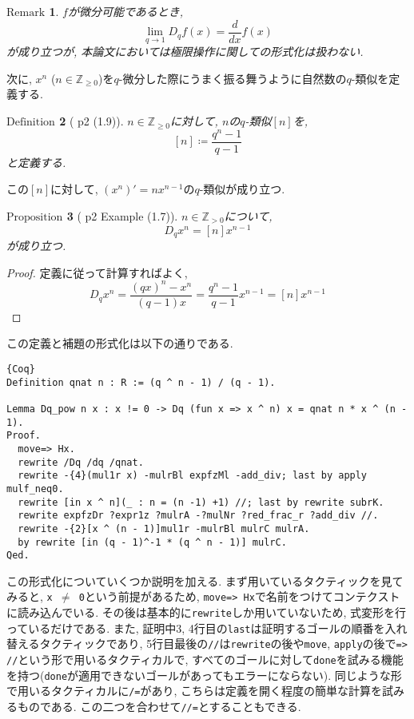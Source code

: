 \documentclass[11pt]{jsreport}
\theoremstyle{mystyle}
\newtheorem{df}{$\textrm{Definition}$}[subsection]
\newtheorem{prop}[df]{$\textrm{Proposition}$}
\newtheorem{rmk}[df]{$\textrm{Remark}$}
\newcommand{\bdf}{\begin{shadebox} \begin{df}}
\newcommand{\edf}{\end{df} \end{shadebox}}
\newcommand{\bprop}{\begin{shadebox} \begin{prop}}
\newcommand{\eprop}{\end{prop} \end{shadebox}}
\newcommand{\brmk}{\begin{rmk}}
\newcommand{\ermk}{\end{rmk}}
\newcommand{\bpf}{\begin{proof}}
\newcommand{\epf}{\end{proof}}
\newcommand{\ra}{\rightarrow}
\newcommand{\Z}{\mathbb{Z}}
\newcommand{\0}{\textbf{0}}
\newcommand{\1}{\textbf{1}}
\newcommand{\2}{\textbf{2}}
\begin{document}
\brmk
  $f$が微分可能であるとき, 
  \[
    \lim_{q\ra1} D_qf(x) = \frac{d}{dx}f(x)
  \] 
  が成り立つが, 本論文においては極限操作に関しての形式化は扱わない. 
\ermk
次に, $x ^ n$ ($n \in \Z_{\ge 0}$)を$q$-微分した際にうまく振る舞うように自然数の$q$-類似を定義する. 
\bdf[\cite{Kac} p2 (1.9)]
  $n \in \Z_{\ge 0}$に対して, $n$の$q$-類似$[n]$を, 
  \[
    [n] \coloneqq \frac{q^n - 1}{q - 1}
  \]
  と定義する. 
\edf
この$[n]$に対して, $(x^n)' = n x^{n-1}$の$q$-類似が成り立つ.
\bprop[\cite{Kac} p2 Example (1.7)]
  $n \in \Z_{>0}$について, 
  \[
    D_q x^n = [n] x ^{n - 1}
  \]
  が成り立つ. 
\eprop
\bpf
  定義に従って計算すればよく, 
  \[
    D_q x ^ n = \frac{(qx) ^ n - x ^ n}{(q - 1) x}
                 = \frac{q^n - 1}{q - 1} x ^ {n - 1}
                 = [n] x ^ {n - 1}
  \] 
\epf
この定義と補題の形式化は以下の通りである. 
\begin{lstlisting}{Coq}
Definition qnat n : R := (q ^ n - 1) / (q - 1).

Lemma Dq_pow n x : x != 0 -> Dq (fun x => x ^ n) x = qnat n * x ^ (n - 1).
Proof.
  move=> Hx.
  rewrite /Dq /dq /qnat.
  rewrite -{4}(mul1r x) -mulrBl expfzMl -add_div; last by apply mulf_neq0.
  rewrite [in x ^ n](_ : n = (n -1) +1) //; last by rewrite subrK.
  rewrite expfzDr ?expr1z ?mulrA -?mulNr ?red_frac_r ?add_div //.
  rewrite -{2}[x ^ (n - 1)]mul1r -mulrBl mulrC mulrA.
  by rewrite [in (q - 1)^-1 * (q ^ n - 1)] mulrC.
Qed.
\end{lstlisting}
この形式化についていくつか説明を加える. まず用いているタクティックを見てみると, {\tt x $\neq$ 0}という前提があるため, {\tt move=> Hx}で名前をつけてコンテクストに読み込んでいる. その後は基本的に{\tt rewrite}しか用いていないため, 式変形を行っているだけである. また, 証明中3, 4行目の{\tt last}は証明するゴールの順番を入れ替えるタクティックであり, 5行目最後の{\tt //}は{\tt rewrite}の後や{\tt move}, {\tt apply}の後で{\tt => //}という形で用いるタクティカルで, すべてのゴールに対して{\tt done}を試みる機能を持つ({\tt done}が適用できないゴールがあってもエラーにならない). 同じような形で用いるタクティカルに{\tt /=}があり, こちらは定義を開く程度の簡単な計算を試みるものである. この二つを合わせて{\tt //=}とすることもできる. 
\end{document}
